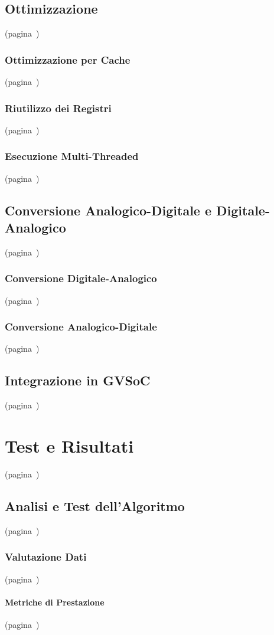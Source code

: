 \section{Ottimizzazione}(pagina~\pageref{sec:optim})
\subsection{Ottimizzazione per Cache}(pagina~\pageref{sec:cache_friendly})
\subsection{Riutilizzo dei Registri}(pagina~\pageref{sec:reg_reuse})
\subsection{Esecuzione Multi-Threaded}(pagina~\pageref{sec:multithread})
\section{Conversione Analogico-Digitale e Digitale-Analogico}(pagina~\pageref{sec:mod_gvsoc})
\subsection{Conversione Digitale-Analogico}(pagina~\pageref{sec:dac})
\subsection{Conversione Analogico-Digitale}(pagina~\pageref{sec:adc})
\section{Integrazione in GVSoC}(pagina~\pageref{sec:gvsoc_int})

\chapter{Test e Risultati} (pagina~\pageref{chap:test})
\section{Analisi e Test dell'Algoritmo}(pagina~\pageref{sec:alg_anal})
\subsection{Valutazione Dati}(pagina~\pageref{sec:bench})
\subsubsection{Metriche di Prestazione}(pagina~\pageref{sec:Data_Perf})
